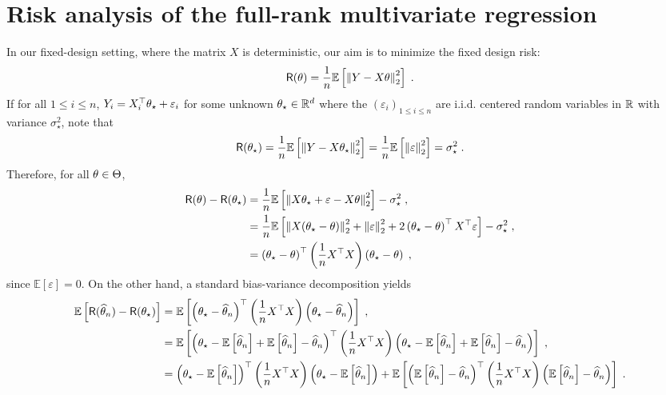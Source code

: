 \section{Risk analysis of the full-rank multivariate regression}
\label{sec:risk:fullrank}
In our fixed-design setting, where the matrix $X$ is deterministic, our aim is to minimize the fixed design risk:
$$
\mathsf{R}(\theta) = \frac{1}{n}\mathbb{E}\left[\left\|Y - X\theta\right\|_2^2\right]\;.
$$
If for all $1\leqslant i \leqslant n$, $Y_i = X^\top_i \theta_{\star} + \varepsilon_i$ for some unknown $\theta_\star\in\mathbb{R}^d$ where the $(\varepsilon_i)_{1\leqslant i\leqslant n}$ are i.i.d. centered random variables in $\mathbb{R}$ with variance $\sigma_\star^2$, note that
$$
\mathsf{R}(\theta_\star) = \frac{1}{n}\mathbb{E}\left[\left\|Y - X\theta_\star\right\|_2^2\right]= \frac{1}{n}\mathbb{E}\left[\left\|\varepsilon\right\|_2^2\right] = \sigma_\star^2\;.
$$
Therefore, for all $\theta\in\Theta$,
\begin{align*}
\mathsf{R}(\theta) - \mathsf{R}(\theta_\star) &=    \frac{1}{n}\mathbb{E}\left[\left\|X\theta_\star + \varepsilon - X\theta\right\|_2^2\right] - \sigma_\star^2\;,\\
&=  \frac{1}{n}\mathbb{E}\left[\left\|X(\theta_\star-\theta)\right\|_2^2 + \left\|\varepsilon\right\|_2^2 + 2 \left(\theta_\star-\theta\right)^\top X^\top \varepsilon\right] - \sigma_\star^2\;,\\
&= \left(\theta_\star-\theta\right)^\top \left(\frac{1}{n}X^\top X\right) \left(\theta_\star-\theta\right)\;,
\end{align*}
since $\mathbb{E}[\varepsilon] = 0$. On the other hand, a standard bias-variance decomposition yields
\begin{align*}
\mathbb{E}\left[\mathsf{R}(\widehat {\theta}_n) - \mathsf{R}(\theta_\star)\right] &=  \mathbb{E}\left[ \left(\theta_\star-\widehat {\theta}_n\right)^\top \left(\frac{1}{n}X^\top X\right) \left(\theta_\star-\widehat {\theta}_n\right)\right]\;,\\
&=  \mathbb{E}\left[ \left(\theta_\star-\mathbb{E}\left[\widehat {\theta}_n\right] + \mathbb{E}\left[\widehat {\theta}_n\right] - \widehat {\theta}_n\right)^\top \left(\frac{1}{n}X^\top X\right) \left(\theta_\star-\mathbb{E}\left[\widehat {\theta}_n\right] + \mathbb{E}\left[\widehat {\theta}_n\right] - \widehat {\theta}_n\right)\right]\;,\\
&=\left(\theta_\star-\mathbb{E}\left[\widehat {\theta}_n\right]\right)^\top \left(\frac{1}{n}X^\top X\right) \left(\theta_\star-\mathbb{E}\left[\widehat {\theta}_n\right] \right) + \mathbb{E}\left[ \left(\mathbb{E}\left[\widehat {\theta}_n\right] - \widehat {\theta}_n\right)^\top \left(\frac{1}{n}X^\top X\right) \left(\mathbb{E}\left[\widehat {\theta}_n\right] - \widehat {\theta}_n\right)\right]\;.
\end{align*}


